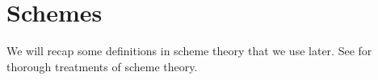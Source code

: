 \section{Schemes}
We will recap some definitions in scheme theory that we use later.
See \cite{vakil,harts} for thorough treatments of scheme theory.









